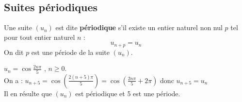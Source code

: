 \subsection*{Suites périodiques}
\begin{definition}
Une suite $(u_{n})$ est dite  \textbf{périodique} s'il existe un entier naturel non nul $ p $ tel pour tout entier naturel $ n $ :\[u_{n+p}=u_{n}\]
On dit $ p $ est une période de la suite $(u_{n})$.
\end{definition} 
\begin{example}
$ u_{n}= \cos\frac{2n\pi}{5} $ , $ n\geq 0 $.\\
On a : $ u_{n+5}=\cos(\frac{2(n+5)\pi}{5})=\cos(\frac{2n\pi}{5}+2\pi) $ donc
$ u_{n+5}=u_{n}$ \\
Il en résulte que $(u_{n})$ est périodique et 5 est une période.
\end{example}
